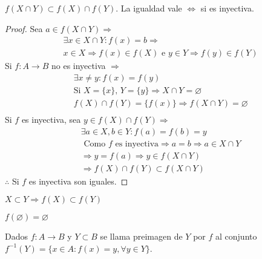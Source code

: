 \begin{prop}
    $f(X \cap Y) \subset f(X) \cap f(Y)$. La igualdad vale $\iff$ si es inyectiva.
    \begin{proof}
        Sea $a \in f(X \cap Y) \Rightarrow$ \begin{align*}
             & \exists x \in X \cap Y : f(x) = b \Rightarrow                                  \\
             & x \in X \Rightarrow f(x) \in f(X) \text{ e } y \in Y \Rightarrow f(y) \in f(Y)
        \end{align*}
        Si $f: A \to B$ no es inyectiva $\Rightarrow$
        \begin{align*}
             & \exists x \neq y : f(x) = f(y)                                             \\
             & \text{Si } X = \{x\}\text{, } Y = \{y\} \Rightarrow X \cap Y = \varnothing \\
             & f(X) \cap f(Y) = \{f(x)\} \Rightarrow f(X \cap Y) = \varnothing            \\
        \end{align*}
        Si $f$ es inyectiva, sea $y \in f(X) \cap f(Y) \Rightarrow$
        \begin{align*}
             & \exists a \in X, b \in Y : f(a) = f(b) = y                                       \\
             & \text{ Como }f \text{ es inyectiva} \Rightarrow a = b \Rightarrow a \in X \cap Y \\
             & \Rightarrow y = f(a) \Rightarrow y \in f(X \cap Y)                               \\
             & \Rightarrow f(X) \cap f(Y) \subset f(X \cap Y)
        \end{align*}
        $\therefore$ Si $f$ es inyectiva son iguales.
    \end{proof}
\end{prop}


\begin{prop}
    $X \subset Y \Rightarrow f(X) \subset f(Y)$
\end{prop}

\begin{prop}
    $f(\varnothing) = \varnothing$
\end{prop}

\begin{definition}
    Dados $f: A \to B$ y $Y \subset B$ se llama preimagen de $Y$ por $f$ al conjunto $f^{-1}(Y) = \{x \in A : f(x) = y, \forall y \in Y\}$.
\end{definition}

